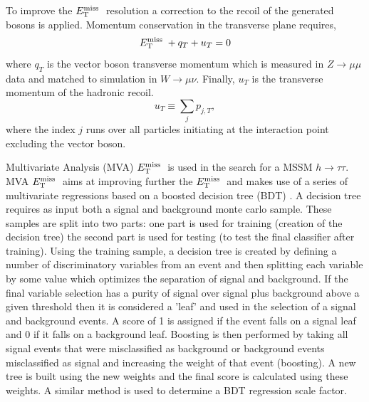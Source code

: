 To improve the $E_\mathrm{T}^{\mathrm{miss}}\;$ resolution a correction to the recoil of the generated bosons is applied. 
Momentum conservation in the transverse plane requires,
\begin{equation}
E_\mathrm{T}^{\mathrm{miss}}\;+q_{T}+u_{T}=0
\label{eq:recoilEq}
\end{equation}
where $q_{T}$ is the vector boson transverse momentum which is measured
in $Z\rightarrow\mu\mu$ data and matched to simulation in $W\rightarrow\mu\nu$.
Finally, $u_{T}$ is the transverse momentum of the hadronic recoil.
\begin{equation}
u_{T}\equiv\sum_{j} p_{j,T},
\end{equation}
where the index $j$ runs over all particles initiating at the interaction point excluding
the vector boson. 

Multivariate Analysis (MVA) 
$E_\mathrm{T}^{\mathrm{miss}}\;$ is used in the search for a MSSM $h\rightarrow\tau\tau$.
MVA $E_\mathrm{T}^{\mathrm{miss}}\;$ aims at improving further the $E_\mathrm{T}^{\mathrm{miss}}\;$ and makes use of a series of multivariate regressions
based on a boosted decision tree (BDT) \cite{BDT}.
A decision tree requires as input both a signal and background monte carlo sample.
These samples are split into two parts: one part is used for training (creation of the decision tree)
the second part is used for testing (to test the final classifier after training).
Using the training sample, a decision tree is created by defining a number 
of discriminatory variables from
an event and then splitting each variable by some value which optimizes
the separation of signal and background. 
If the final 
variable selection has a purity of signal over signal plus background above a given threshold
then it is considered a 'leaf' and used in the selection of a signal and background events.
A score of 1 is assigned if the event falls on a signal leaf and 0 if it falls on a background leaf.  
Boosting is then performed by taking all signal events that were misclassified as
background or background events misclassified as signal and increasing the weight of
that event (boosting). A new tree is built using the new weights and the final score
is calculated using these weights. A similar method is used to determine a BDT regression
scale factor. 


